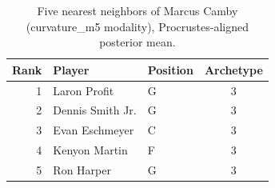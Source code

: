 \begin{table}[htbp]
  \centering\small
  \begin{tabular}{rllc}
    \toprule
    Rank & Player & Position & Archetype \\
    \midrule
    1 & Laron Profit & G & 3 \\
    2 & Dennis Smith Jr. & G & 3 \\
    3 & Evan Eschmeyer & C & 3 \\
    4 & Kenyon Martin & F & 3 \\
    5 & Ron Harper & G & 3 \\
    \bottomrule
  \end{tabular}
  \caption{Five nearest neighbors of Marcus Camby (curvature_m5 modality), Procrustes-aligned posterior mean.}
  \label{tab:Marcus_Camby_neighbors_curvature_m5}
\end{table}

